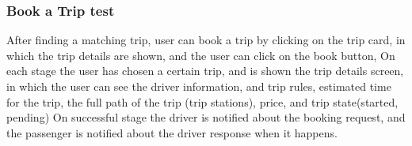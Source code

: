 \documentclass[a4paper, 12pt]{report} %
\begin{document}
                \subsubsection{Book a Trip test}
                After finding a matching trip, user can book a trip by clicking on the trip card, in which the trip details are shown, and the user can click on the book button, 
                On each stage the user has chosen a certain trip, and is shown the trip details screen, in which the user can see the driver information, and trip rules, estimated time for the trip, the full path of the trip (trip stations), price, and trip state(started, pending)
                On successful stage the driver is notified about the booking request, and the passenger is notified about the driver response when it happens.
\end{document}
